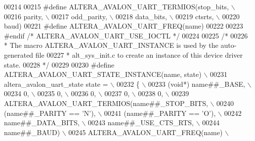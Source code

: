 \begin{DoxyCode}
00214 
00215 \textcolor{preprocessor}{#define ALTERA\_AVALON\_UART\_TERMIOS(stop\_bits,  \(\backslash\)}
00216 \textcolor{preprocessor}{                                   parity,     \(\backslash\)}
00217 \textcolor{preprocessor}{                                   odd\_parity, \(\backslash\)}
00218 \textcolor{preprocessor}{                                   data\_bits,  \(\backslash\)}
00219 \textcolor{preprocessor}{                                   ctsrts,     \(\backslash\)}
00220 \textcolor{preprocessor}{                                   baud)}
00221 \textcolor{preprocessor}{#define ALTERA\_AVALON\_UART\_FREQ(name)}
00222 
00223 \textcolor{preprocessor}{#endif }\textcolor{comment}{/* ALTERA\_AVALON\_UART\_USE\_IOCTL */}\textcolor{preprocessor}{}
00224 
00225 \textcolor{comment}{/*}
00226 \textcolor{comment}{ * The macro ALTERA\_AVALON\_UART\_INSTANCE is used by the auto-generated file}
00227 \textcolor{comment}{ * alt\_sys\_init.c to create an instance of this device driver state.}
00228 \textcolor{comment}{ */}
00229 
00230 \textcolor{preprocessor}{#define ALTERA\_AVALON\_UART\_STATE\_INSTANCE(name, state) \(\backslash\)}
00231 \textcolor{preprocessor}{  altera\_avalon\_uart\_state state =                     \(\backslash\)}
00232 \textcolor{preprocessor}{   \{                                                   \(\backslash\)}
00233 \textcolor{preprocessor}{     (void*) name##\_BASE,                              \(\backslash\)}
00234 \textcolor{preprocessor}{     0,                                                \(\backslash\)}
00235 \textcolor{preprocessor}{     0,                                                \(\backslash\)}
00236 \textcolor{preprocessor}{     0,                                                \(\backslash\)}
00237 \textcolor{preprocessor}{     0,                                                \(\backslash\)}
00238 \textcolor{preprocessor}{     0,                                                \(\backslash\)}
00239 \textcolor{preprocessor}{     ALTERA\_AVALON\_UART\_TERMIOS(name##\_STOP\_BITS,      \(\backslash\)}
00240 \textcolor{preprocessor}{                               (name##\_PARITY == 'N'), \(\backslash\)}
00241 \textcolor{preprocessor}{                               (name##\_PARITY == 'O'), \(\backslash\)}
00242 \textcolor{preprocessor}{                               name##\_DATA\_BITS,       \(\backslash\)}
00243 \textcolor{preprocessor}{                               name##\_USE\_CTS\_RTS,     \(\backslash\)}
00244 \textcolor{preprocessor}{                               name##\_BAUD)            \(\backslash\)}
00245 \textcolor{preprocessor}{     ALTERA\_AVALON\_UART\_FREQ(name)                     \(\backslash\)}

\end{DoxyCode}
